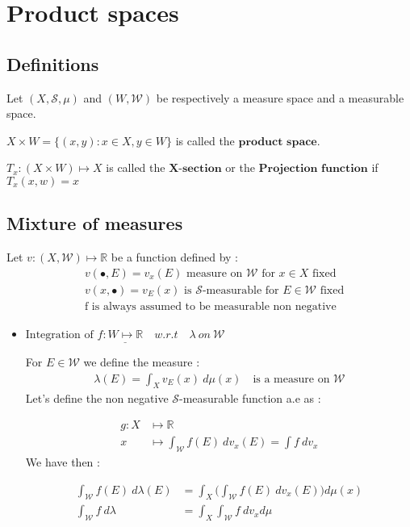 \section{\LARGE Product spaces}
\subsection{Definitions}
Let $(X,\mathcal{S},\mu)$ and $(W,\mathcal{W})$ be respectively a measure space and a measurable space.

$X\times W = \{(x,y) : x \in X, y \in W\}$ is called the $\textbf{product space}$.

$T_x:(X\times W ) \longmapsto  X$ is called the $\textbf{X-section}$ or the $\textbf{Projection function}$ if $T_x(x,w) = x$
\subsection{Mixture of measures}
Let $v : (X, \mathcal{W}) \longmapsto \mathbb{R} $ be a function defined by :
\begin{align*}
&v(\bullet, E) = v_x(E) \text{ measure on $\mathcal{W}$ for $x \in X$ fixed} \\
&v(x, \bullet) = v_E(x) \text{ is $\mathcal{S}$-measurable for $E \in \mathcal{W}$ fixed} \\
&\text{f is always assumed to be measurable non negative}
\end{align*}

\begin{itemize}
\item $\underline{\text{Integration of }f:W \longmapsto \mathbb{R} \quad w.r.t \quad \lambda \:on\: \mathcal{W}}$

For $E \in \mathcal{W}$ we define the measure :
\begin{align*}
\lambda(E) = \int_X v_E(x)\:d\mu(x)\quad \text{is a measure on } \mathcal{W}
\end{align*}
Let's define the non negative $\mathcal{S}$-measurable function a.e as :

\begin{align*}
g : X &\longmapsto \mathbb{R} \\
x &\longmapsto \int_{\mathcal{W}}f(E)\:dv_x(E) = \int f\:dv_x
\end{align*}
We have then : 

\begin{align*}
\int_{\mathcal{W}}f(E)\:d\lambda(E) &= \int_X\Big(\int_{\mathcal{W}}f(E)\:dv_x(E)\Big)d\mu(x) \\
\int_{\mathcal{W}}f\:d\lambda &= \int_X\int_{\mathcal{W}}f\:dv_xd\mu
\end{align*}
\end{itemize}

